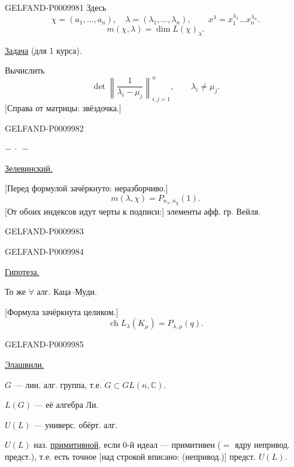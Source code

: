 \begin{GelfandAdjacentEvidence}{GELFAND-P000998}{1}
Здесь
\[
\chi=(a_1,\ldots,a_n),\quad \lambda=(\lambda_1,\ldots,\lambda_n),
\qquad x^\lambda=x_1^{\lambda_1}\ldots x_n^{\lambda_n}.
\]
\[
m(\chi,\lambda)=\dim L(\chi)_\lambda.
\]

\underline{\underline{Задача}} (для 1 курса).

Вычислить
\[
\det\left\|\frac{1}{\lambda_i-\mu_j}\right\|_{i,j=1}^{n},
\qquad \lambda_i\ne\mu_j.
\]
[Справа от матрицы: звёздочка.]
\end{GelfandAdjacentEvidence}
\begin{GelfandAdjacentEvidence}{GELFAND-P000998}{2}


\begin{center}$-\ \cdot\ -$\end{center}

\underline{Зелевинский.}

[Перед формулой зачёркнуто: неразборчиво.]
\[
m(\lambda,\chi)=P_{n_\lambda,n_\chi}(1).
\]
[От обоих индексов идут черты к подписи:] элементы афф. гр. Вейля.
\end{GelfandAdjacentEvidence}
\begin{GelfandAdjacentEvidence}{GELFAND-P000998}{3}

\end{GelfandAdjacentEvidence}
\begin{GelfandAdjacentEvidence}{GELFAND-P000998}{4}


\underline{Гипотеза.}

То же $\forall$ алг. Каца--Муди.

[Формула зачёркнута целиком.]
\[
\operatorname{ch}L_\lambda(K_\mu)=P_{\lambda,\mu}(q).
\]
\end{GelfandAdjacentEvidence}
\begin{GelfandAdjacentEvidence}{GELFAND-P000998}{5}


\underline{Элашвили.}

$G$ --- лин. алг. группа, т.е. $G\subset GL(n,\mathbb C)$.

$L(G)$ --- её алгебра Ли.

$U(L)$ --- универс. обёрт. алг.

$U(L)$ наз. \underline{примитивной}, если $0$-й идеал --- примитивен ($=$ ядру непривод. предст.), т.е. есть точное [над строкой вписано: (непривод.)] предст. $U(L)$.
\end{GelfandAdjacentEvidence}
